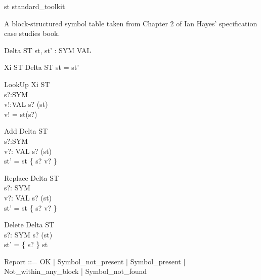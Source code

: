 \begin{zsection}
  \SECTION st \parents standard\_toolkit
\end{zsection}

A block-structured symbol table taken from Chapter 2
of Ian Hayes' specification case studies book.

\begin{zed}
\end{zed}

\begin{schema}{Delta ST}
 st, st' : SYM \pfun VAL \\
\end{schema}

\begin{schema}{Xi ST}
  Delta ST
\where
  st = st'
\end{schema}

\begin{schema}{LookUp}
  Xi ST \\
  s?:SYM \\
  v!:VAL
\where
  s? \in \dom(st) \\
  v! = st(s?)
\end{schema}

\begin{schema}{Add}
  Delta ST \\
  s?:SYM \\
  v?: VAL
\where
  s? \notin \dom(st) \\
  st' = st \cup \{ s? \mapsto v? \}
\end{schema}

\begin{schema}{Replace}
  Delta ST \\
  s?: SYM \\
  v?: VAL
\where
  s? \in \dom(st) \\
  st' = st \oplus \{ s? \mapsto v? \}
\end{schema}

\begin{schema}{Delete}
  Delta ST \\
  s?: SYM
\where
  s? \in \dom(st) \\
  st' = \{ s? \} \ndres st
\end{schema}


\begin{zed}
  Report ::= OK
                  | Symbol\_not\_present
		  | Symbol\_present
		  | Not\_within\_any\_block
		  | Symbol\_not\_found
\end{zed}

